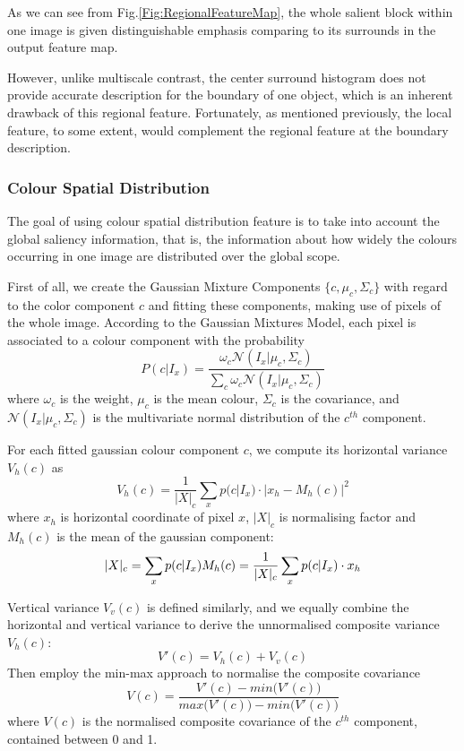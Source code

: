 \documentclass[10pt,twocolumn,letterpaper]{article}
\newcommand{\SUM}{\sum\limits}
\begin{document}
As we can see from Fig.\ref{Fig:RegionalFeatureMap}, the whole salient block within one image is
given distinguishable emphasis comparing to its surrounds in the output feature map. 

However, unlike multiscale contrast, the center surround histogram does not provide accurate description for the 
boundary of one object, which is an inherent drawback of this regional feature. Fortunately, 
as mentioned previously, the local feature, to some extent, would complement the regional feature 
at the boundary description. 



\subsubsection{Colour Spatial Distribution}

The goal of using colour spatial distribution feature is to take into account the global 
saliency information, that is, the information about how widely the colours occurring in 
one image are distributed over the global scope. 

First of all, we create the Gaussian Mixture Components $\{c, \mu_c, \Sigma_c\}$ 
with regard to the color component $c$ and fitting these components, making use of pixels of the whole image. 
According to the Gaussian Mixtures Model, each pixel is associated to a colour component with the probability $$
    P(c|I_x) = \frac{\omega_c\mathcal{N}(I_x|\mu_c,\Sigma_c)}{\SUM_c \omega_c \mathcal{N}(I_x|\mu_c,\Sigma_c)}$$ 
where $\omega_c$ is the weight, $\mu_c$ is the mean colour, $\Sigma_c$ is the covariance, and $\mathcal N(I_x|\mu_c,\Sigma_c)$ is the multivariate normal distribution of the $c^{th}$ component. 

For each fitted gaussian colour component $c$, we compute its horizontal variance $V_{h}(c)$ as 
$$V_{h}(c) = \frac{1}{|X|_{c}} \sum_{x} p (c|I_{x}) \cdot | x_{h} - M_{h}(c) |^{2}$$ 
where $x_h$ is horizontal coordinate of pixel $x$, $|X|_c$ is normalising factor and $M_h (c)$ 
is the mean of the gaussian component:
$$|X|_c = \sum_x p(c|I_x)\\M_h (c) = \frac{1}{|X|_c} \sum_{x} p(c|I_x) \cdot x_h$$

Vertical variance $V_{v}(c)$ is defined similarly, and we equally combine the horizontal 
and vertical variance to derive the unnormalised composite variance $V_h (c)$:
$$V' (c) = V_h (c) + V_v (c) $$
Then employ the min-max approach to normalise the composite covariance
$$V (c) = \frac{V'(c) - min \big(V'(c)\big) }{max \big(V'(c)\big) - min \big(V'(c)\big)}$$
where $V(c)$ is the normalised composite covariance of the $c^{th}$ component, contained between 0 and 1.
\end{document}
